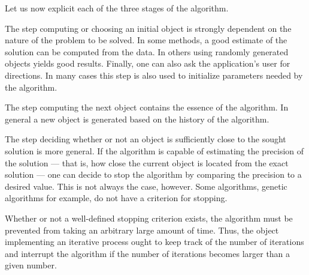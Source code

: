 \noindent Let us now explicit each of the three stages of the
algorithm.

The step computing or choosing an initial object is strongly
dependent on the nature of the problem to be solved. In some
methods, a good estimate of the solution can be computed from the
data. In others using randomly generated objects yields good
results. Finally, one can also ask the application's user for
directions. In many cases this step is also used to initialize
parameters needed by the algorithm.

The step computing the next object contains the essence of the
algorithm. In general a new object is generated based on the
history of the algorithm.

The step deciding whether or not an object is sufficiently close
to the sought solution is more general. If the algorithm is
capable of estimating the precision of the solution --- that is,
how close the current object is located from the exact solution
--- one can decide to stop the algorithm by comparing the
precision to a desired value. This is not always the case,
however. Some algorithms, genetic algorithms for example, do not
have a criterion for stopping.

Whether or not a well-defined stopping criterion exists, the
algorithm must be prevented from taking an arbitrary large amount
of time. Thus, the object implementing an iterative process ought
to keep track of the number of iterations and interrupt the
algorithm if the number of iterations becomes larger than a given
number.

